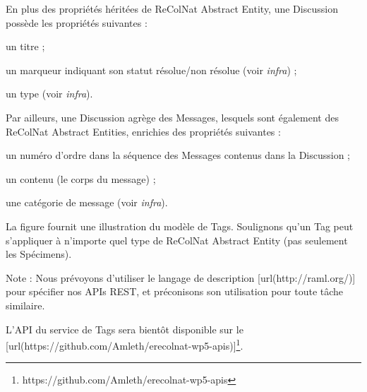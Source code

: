 

\startsection[title={Présentation du modèle de Discussions},reference=mcs:disc]

En plus des propriétés héritées de ReColNat Abstract Entity, une Discussion possède les propriétés suivantes :

\startitemize
\item un titre ;
\item un marqueur indiquant son statut résolue/non résolue (voir {\em infra}) ;
\item un type (voir {\em infra}).
\stopitemize

Par ailleurs, une Discussion agrège des Messages, lesquels sont également des ReColNat Abstract Entities, enrichies des propriétés suivantes :

\startitemize
\item un numéro d'ordre dans la séquence des Messages contenus dans la Discussion ;
\item un contenu (le corps du message) ;
\item une catégorie de message (voir {\em infra}).
\stopitemize

\startsection[title={Présentation du modèle de Tags},reference=mcs:tags]

La figure  fournit une illustration du modèle de Tags.
Soulignons qu'un Tag peut s'appliquer à n'importe quel type de ReColNat Abstract Entity (pas seulement les Spécimens). 

\startsection[title={L'API du service de Tags}]

Note : Nous prévoyons d'utiliser le langage de description [url(http://raml.org/)] pour spécifier nos APIs REST, et préconisons son utilisation pour toute tâche similaire.

L'API du service de Tags sera bientôt disponible sur le [url(https://github.com/Amleth/erecolnat-wp5-apis)]\footnote{https://github.com/Amleth/erecolnat-wp5-apis}.